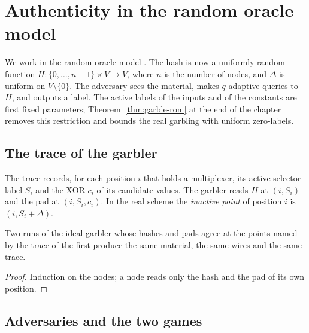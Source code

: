 \chapter{Authenticity in the random oracle model}
\label{chap:random-oracle}

We work in the random oracle model \cite{BR93}. The hash is now a uniformly random function $H \colon \{0, \dots, n - 1\} \times V \to V$, where
$n$ is the number of nodes, and $\Delta$ is uniform on $V \setminus \{0\}$. The adversary sees
the material, makes $q$ adaptive queries to $H$, and outputs a label. The active labels of the
inputs and of the constants are first fixed parameters; Theorem~\ref{thm:garble-rom} at the end of
the chapter removes this restriction and bounds the real garbling with uniform zero-labels.

\section{The trace of the garbler}

\begin{definition}[Trace]
  \label{def:trace}
  \leanok
  The trace records, for each position $i$ that holds a multiplexer, its active selector label
  $S_i$ and the XOR $c_i$ of its candidate values. The garbler reads $H$ at $(i, S_i)$ and the pad
  at $(i, S_i, c_i)$. In the real scheme the \emph{inactive point} of position $i$ is
  $(i, S_i + \Delta)$.
\end{definition}

\begin{lemma}[Congruence]
  \label{lem:walk-congr}
  \leanok
  Two runs of the ideal garbler whose hashes and pads agree at the points named by the trace of
  the first produce the same material, the same wires and the same trace.
\end{lemma}

\begin{proof}
  \leanok
  Induction on the nodes; a node reads only the hash and the pad of its own position.
\end{proof}

\section{Adversaries and the two games}

